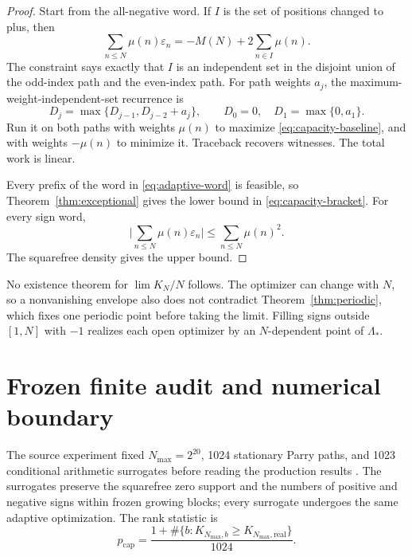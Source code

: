 \documentclass[11pt,a4paper]{article}
\theoremstyle{remark}
\newcommand{\Mob}{\mu}
\newcommand{\Lam}{\Lambda_*}
\newcommand{\eps}{\varepsilon}
\newcommand{\abs}[1]{\lvert#1\rvert}
\begin{document}
\begin{proof}
Start from the all-negative word.  If $I$ is the set of positions changed to
plus, then
\begin{equation}
 \sum_{n\leq N}\Mob(n)\eps_n=-M(N)+2\sum_{n\in I}\Mob(n).
 \label{eq:capacity-baseline}
\end{equation}
The constraint says exactly that $I$ is an independent set in the disjoint
union of the odd-index path and the even-index path.  For path weights $a_j$,
the maximum-weight-independent-set recurrence is
\begin{equation}
 D_j=\max\{D_{j-1},D_{j-2}+a_j\},
 \qquad D_0=0,\quad D_1=\max\{0,a_1\}.
 \label{eq:mwis}
\end{equation}
Run it on both paths with weights $\Mob(n)$ to maximize
\eqref{eq:capacity-baseline}, and with weights $-\Mob(n)$ to minimize it.
Traceback recovers witnesses.  The total work is linear.

Every prefix of the word in \eqref{eq:adaptive-word} is feasible, so
Theorem~\ref{thm:exceptional} gives the lower bound in
\eqref{eq:capacity-bracket}.  For every sign word,
\[
 \abs{\sum_{n\leq N}\Mob(n)\eps_n}
 \leq\sum_{n\leq N}\Mob(n)^2.
\]
The squarefree density gives the upper bound.
\end{proof}

No existence theorem for $\lim K_N/N$ follows.  The optimizer can change with
$N$, so a nonvanishing envelope also does not contradict
Theorem~\ref{thm:periodic}, which fixes one periodic point before taking the
limit.  Filling signs outside $[1,N]$ with $-1$ realizes each open optimizer
by an $N$-dependent point of $\Lam$.

\section{Frozen finite audit and numerical boundary}

The source experiment fixed $N_{\max}=2^{20}$, 1024 stationary Parry paths,
and 1023 conditional arithmetic surrogates before reading the production
results \cite{WangHenonMobius2026}.  The surrogates preserve the squarefree
zero support and the numbers of positive and negative signs within frozen
growing blocks; every surrogate undergoes the same adaptive optimization.
The rank statistic is
\begin{equation}
 p_{\mathrm{cap}}=
 \frac{1+\#\{b:K_{N_{\max},b}\geq K_{N_{\max},\mathrm{real}}\}}{1024}.
 \label{eq:rank-p}
\end{equation}
\end{document}
